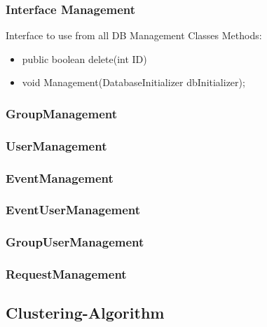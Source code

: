 	\subsubsection{Interface Management}
	Interface to use from all DB Management Classes
	\newline Methods:
	\begin{itemize} 
		\item public boolean delete(int ID)			
		
		\item void Management(DatabaseInitializer dbInitializer);
	\end{itemize}
	\subsubsection{GroupManagement}
	\subsubsection{UserManagement}
	\subsubsection{EventManagement}
	\subsubsection{EventUserManagement}
	\subsubsection{GroupUserManagement}
	\subsubsection{RequestManagement}
	
	
	\subsection{Clustering-Algorithm}
	
